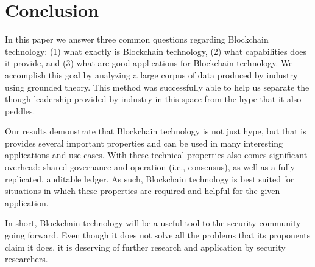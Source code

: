 
\section{Conclusion}
In this paper we answer three common questions regarding Blockchain technology: (1) what exactly is Blockchain technology, (2) what capabilities does it provide, and (3) what are good applications for Blockchain technology.
We accomplish this goal by analyzing a large corpus of data produced by industry using grounded theory.
This method was successfully able to help us separate the though leadership provided by industry in this space from the hype that it also peddles.

Our results demonstrate that Blockchain technology is not just hype, but that is provides several important properties and can be used in many interesting applications and use cases.
With these technical properties also comes significant overhead: shared governance and operation (i.e., consensus), as well as  a fully replicated, auditable ledger.
As such, Blockchain technology is best suited for situations in which these properties are required and helpful for the given application.

In short, Blockchain technology will be a useful tool to the security community going forward.
Even though it does not solve all the problems that its proponents claim it does, it is deserving of further research and application by security researchers.